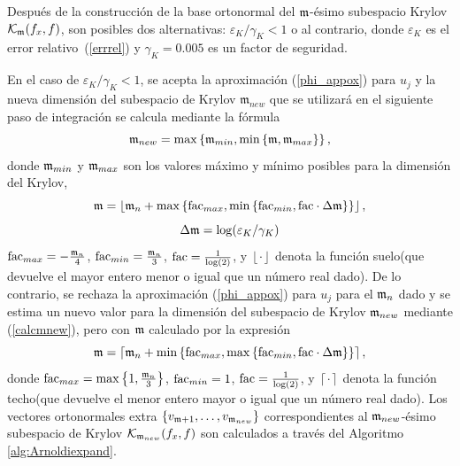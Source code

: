 Después de la construcción de la base ortonormal del $\mathfrak{m}$-ésimo subespacio Krylov $\mathcal{K}_{\mathfrak{m}}(f_x,f)$, son posibles dos alternativas: $\varepsilon_{K}/\gamma_{K}< 1$ o al contrario, donde $\varepsilon_{K}$
es el error relativo~(\ref{errrel}) y $\gamma_{K}=0.005$ es un factor de seguridad.

En el caso de $\varepsilon_{K}/\gamma_{K}< 1$, se acepta la aproximación (\ref{phi_appox}) para $u_j$ y la nueva dimensión del subespacio de Krylov $\mathfrak{m}_{new}$ que se utilizará en el siguiente paso de integración se calcula mediante la fórmula
\begin{equation}\label{calcmnew}
    \mathfrak{m}_{new}= \max\left\{ \mathfrak{m}_{min}, \min\left\{ \mathfrak{m} , \mathfrak{m}_{max}  \right\} \right\},
\end{equation}
    donde $\mathfrak{m}_{min}$ y $\mathfrak{m}_{max}$ son los valores máximo y mínimo posibles para la dimensión del Krylov,
\begin{equation*}
    \mathfrak{m} = \left\lfloor \mathfrak{m}_{n} + \max\left\{ \mathrm{fac}_{max} , \min\left\{ \mathrm{fac}_{min},
            \mathrm{fac}\cdot\Delta\mathfrak{m} \right\}  \right\} \right\rfloor,
\end{equation*}
\begin{equation}
    \Delta\mathfrak{m}=\log(\varepsilon_{K}/\gamma_{K}) \label{delta_m}
\end{equation}
$\mathrm{fac}_{max}= -\frac{\mathfrak{m}_n}{4}$, $\mathrm{fac}_{min}= \frac{\mathfrak{m}_n}{3}$, $\mathrm{fac}=\frac{1}{\log( 2)}$, y $\left\lfloor \cdot \right\rfloor$ denota la función suelo(que devuelve el mayor entero menor o igual que un número real dado). De lo contrario, se rechaza la aproximación (\ref{phi_appox}) para $u_j$ para el $\mathfrak{m}_n$ dado y se estima un nuevo valor para la dimensión del subespacio de Krylov $\mathfrak{m}_{new}$ mediante (\ref{calcmnew}), pero con $\mathfrak{m}$ calculado por la expresión
\begin{equation*}
    \mathfrak{m} = \left\lceil \mathfrak{m}_{n} + \min\left\{ \mathrm{fac}_{max} , \max\left\{ \mathrm{fac}_{min},
            \mathrm{fac}\cdot\Delta\mathfrak{m} \right\}  \right\} \right\rceil,
\end{equation*}
donde $\mathrm{fac}_{max}= \max\left\{  1,\frac{\mathfrak{m}_{n}}{3}  \right\}$, $\mathrm{fac}_{min}= 1 $, $\mathrm{fac}=\frac{1}{\log (2)}$, y $\left\lceil \cdot \right\rceil$ denota la función techo(que devuelve el menor entero mayor o igual que un número real dado). Los vectores ortonormales extra $\{v_{\mathfrak{m}+1},\ldots,v_{\mathfrak{m}_{new}} \}$ correspondientes al $\mathfrak{m}_{new}$-ésimo subespacio de Krylov $\mathcal{K}_{\mathfrak{m}_{new}}(f_x,f)$ son calculados a través del Algoritmo \ref{alg:Arnoldiexpand}.
